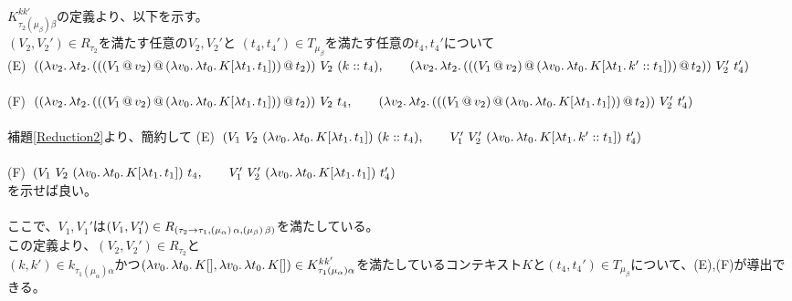    \\
   $K^{kk'}_{\tau_2(\mu_{\beta})\beta}$の定義より、以下を示す。\\
   $(V_2,V_2')\in R_{\tau_2}$を満たす任意の$V_2,V_2'$と $(t_4, t_4')\in T_{\mu_{\beta}}$を満たす任意の$t_4, t_4'$について\\
   (E)\ $(\LamP{v_2}{\Lam{t_2}
                {\AppP{\AppP{\AppP{V_1}{v_2}}
                    {\LamP{v_0}{\Lam{t_0}
                        {K[\Lam{t_1}{t_1}]}}}}{t_2}}}\ V_2\ (\Cons{k}{t_4}),\\
   \qquad \LamP{v_2}{\Lam{t_2}
                {\AppP{\AppP{\AppP{V_1}{v_2}}
                    {\LamP{v_0}{\Lam{t_0}
                        {K[\Lam{t_1}{\Cons{k'}{t_1}}]}}}}{t_2}}}\ V_2'\ t_4')$\\
   \\
   (F)\ $(\LamP{v_2}{\Lam{t_2}
                {\AppP{\AppP{\AppP{V_1}{v_2}}
                    {\LamP{v_0}{\Lam{t_0}
                        {K[\Lam{t_1}{t_1}]}}}}{t_2}}}\ V_2\ t_4,\\
   \qquad \LamP{v_2}{\Lam{t_2}
                {\AppP{\AppP{\AppP{V_1}{v_2}}
                    {\LamP{v_0}{\Lam{t_0}
                        {K[\Lam{t_1}{t_1}]}}}}{t_2}}}\ V_2'\ t_4')$\\
   \\
   補題\ref{Reduction2}より、簡約して
   (E)\ $(V_1\ V_2\ \LamP{v_0}{\Lam{t_0}{K[\Lam{t_1}{t_1}]}}\ (\Cons{k}{t_4}),\\
   \qquad V_1'\ V_2'\ \LamP{v_0}{\Lam{t_0}{K[\Lam{t_1}{\Cons{k'}{t_1}}]}}\ t_4')$\\
   \\
   (F)\ $(V_1\ V_2\ \LamP{v_0}{\Lam{t_0}{K[\Lam{t_1}{t_1}]}}\ t_4,\\
   \qquad V_1'\ V_2'\ \LamP{v_0}{\Lam{t_0}{K[\Lam{t_1}{t_1}]}}\ t_4')$\\
   を示せば良い。\\
   \\
   ここで、$V_1,V_1'$は$(V_1,V_1')\in R_{(\tau_2\rightarrow{\tau_1},(\mu_{\alpha})\,\alpha,(\mu_{\beta})\,\beta)}$を満たしている。\\
   この定義より、$(V_2,V_2')\in R_{\tau_2}$と\\
   $(k,k')\in k_{\tau_1(\mu_{\alpha})\alpha}$かつ$(\lambda{v_0}.\,{\lambda{t_0}.\,{K[]}}, \lambda{v_0}.\,{\lambda{t_0}.\,{K[]}})\in  K^{kk'}_{\tau_1(\mu_{\alpha})\alpha}$を満たしているコンテキスト$K$と$(t_4, t_4')\in T_{\mu_{\beta}}$について、(E),(F)が導出できる。\\
\\
\\
